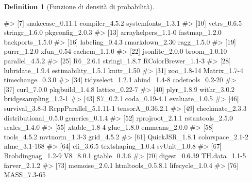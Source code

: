 \documentclass[
  letterpaper,
  DIV=11,
  numbers=noendperiod,
  oneside]{scrreprt}
\newenvironment{Shaded}{\begin{snugshade}}{\end{snugshade}}
\newcommand{\CommentTok}[1]{\textcolor[rgb]{0.37,0.37,0.37}{#1}}
\theoremstyle{definition}
\theoremstyle{plain}
\theoremstyle{definition}
\newtheorem{definition}{Definition}[chapter]
\theoremstyle{remark}
\begin{document}
\begin{definition}[Funzione di densità di
probabilità]
\begin{tcolorbox}
\begin{Shaded}
\begin{Highlighting}[]
\CommentTok{\#\textgreater{}  [7] snakecase\_0.11.1      compiler\_4.5.2        systemfonts\_1.3.1    }
\CommentTok{\#\textgreater{} [10] vctrs\_0.6.5           stringr\_1.6.0         pkgconfig\_2.0.3      }
\CommentTok{\#\textgreater{} [13] arrayhelpers\_1.1{-}0    fastmap\_1.2.0         backports\_1.5.0      }
\CommentTok{\#\textgreater{} [16] labeling\_0.4.3        rmarkdown\_2.30        ragg\_1.5.0           }
\CommentTok{\#\textgreater{} [19] purrr\_1.2.0           xfun\_0.54             cachem\_1.1.0         }
\CommentTok{\#\textgreater{} [22] jsonlite\_2.0.0        broom\_1.0.10          parallel\_4.5.2       }
\CommentTok{\#\textgreater{} [25] R6\_2.6.1              stringi\_1.8.7         RColorBrewer\_1.1{-}3   }
\CommentTok{\#\textgreater{} [28] lubridate\_1.9.4       estimability\_1.5.1    knitr\_1.50           }
\CommentTok{\#\textgreater{} [31] zoo\_1.8{-}14            Matrix\_1.7{-}4          timechange\_0.3.0     }
\CommentTok{\#\textgreater{} [34] tidyselect\_1.2.1      abind\_1.4{-}8           codetools\_0.2{-}20     }
\CommentTok{\#\textgreater{} [37] curl\_7.0.0            pkgbuild\_1.4.8        lattice\_0.22{-}7       }
\CommentTok{\#\textgreater{} [40] plyr\_1.8.9            withr\_3.0.2           bridgesampling\_1.2{-}1 }
\CommentTok{\#\textgreater{} [43] S7\_0.2.1              coda\_0.19{-}4.1         evaluate\_1.0.5       }
\CommentTok{\#\textgreater{} [46] survival\_3.8{-}3        RcppParallel\_5.1.11{-}1 tensorA\_0.36.2.1     }
\CommentTok{\#\textgreater{} [49] checkmate\_2.3.3       distributional\_0.5.0  generics\_0.1.4       }
\CommentTok{\#\textgreater{} [52] rprojroot\_2.1.1       rstantools\_2.5.0      scales\_1.4.0         }
\CommentTok{\#\textgreater{} [55] xtable\_1.8{-}4          glue\_1.8.0            emmeans\_2.0.0        }
\CommentTok{\#\textgreater{} [58] tools\_4.5.2           mvtnorm\_1.3{-}3         grid\_4.5.2           }
\CommentTok{\#\textgreater{} [61] QuickJSR\_1.8.1        colorspace\_2.1{-}2      nlme\_3.1{-}168         }
\CommentTok{\#\textgreater{} [64] cli\_3.6.5             textshaping\_1.0.4     svUnit\_1.0.8         }
\CommentTok{\#\textgreater{} [67] Brobdingnag\_1.2{-}9     V8\_8.0.1              gtable\_0.3.6         }
\CommentTok{\#\textgreater{} [70] digest\_0.6.39         TH.data\_1.1{-}5         farver\_2.1.2         }
\CommentTok{\#\textgreater{} [73] memoise\_2.0.1         htmltools\_0.5.8.1     lifecycle\_1.0.4      }
\CommentTok{\#\textgreater{} [76] MASS\_7.3{-}65}
\end{Highlighting}
\end{Shaded}


\end{tcolorbox}
\end{definition}
\end{document}
